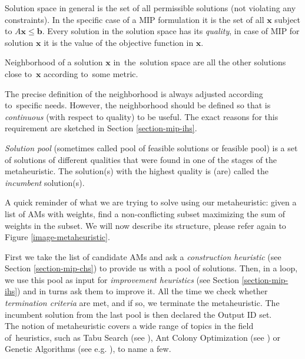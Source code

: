 \begin{define}
	Solution space in general is the set of all permissible solutions (not violating any constraints). In the specific case of a MIP formulation it is the set of all $\mathbf{x}$ subject to $A\mathbf{x} \leqslant \mathbf{b}$. Every solution in the solution space has its \textit{quality}, in case of MIP for solution $\mathbf{x}$ it is the value of the objective function in $\mathbf{x}$.
\end{define}

\begin{define}
	Neighborhood of a solution $\mathbf{x}$ in~the~solution space are all the other solutions close to~$\mathbf{x}$ according to~some metric.
\end{define}

The precise definition of the neighborhood is always adjusted according to~specific needs. However, the neighborhood should be defined so that is \textit{continuous} (with respect to quality) to be useful. The exact reasons for this requirement are sketched in Section \ref{section-mip-ihs}.

\begin{define}
	\textit{Solution pool} (sometimes called pool of feasible solutions or feasible pool) is a set of solutions of different qualities that were found in one of the stages of the metaheuristic. The solution(s) with the highest quality is (are) called the \textit{incumbent} solution(s).
\end{define}

A quick reminder of what we are trying to solve using our metaheuristic: given a list of AMs with weights, find a non-conflicting subset maximizing the sum of weights in the subset. We will now describe its structure, please refer again to Figure \ref{image-metaheuristic}.

First we take the list of candidate AMs and ask a \textit{construction heuristic} (see Section \ref{section-mip-chs}) to provide us with a pool of solutions. Then, in a loop, we use this pool as input for \textit{improvement heuristics} (see Section \ref{section-mip-ihs}) and in turns ask them to improve it. All the time we check whether \textit{termination criteria} are met, and if so, we terminate the metaheuristic. The incumbent solution from the last pool is then declared the Output ID set.\\

The notion of metaheuristic covers a wide range of topics in the field of~heuristics, such as Tabu Search (see \cite{Glover:1997:TS:549765}), Ant Colony Optimization (see \cite{dorigo2004ant}) or Genetic Algorithms (see e.g. \cite{goldberg1989genetic}), to name a few.\\

